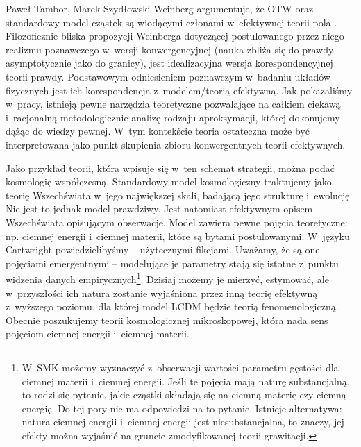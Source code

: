 \begin{artplenv2auth}{Paweł Tambor, Marek Szydłowski}
Weinberg argumentuje, że OTW oraz standardowy model cząstek są wiodącymi członami w~efektywnej teorii pola
\parencite[][]{weinberg_effective_2016}. %
 Filozoficznie bliska propozycji Weinberga dotyczącej postulowanego przez niego realizmu poznawczego w~wersji konwergencyjnej (nauka zbliża się do prawdy asymptotycznie jako do granicy), jest idealizacyjna wersja korespondencyjnej teorii prawdy. Podstawowym odniesieniem poznawczym w~badaniu układów fizycznych jest ich korespondencja z~modelem/teorią efektywną. Jak pokazaliśmy w~pracy, istnieją pewne narzędzia teoretyczne pozwalające na całkiem ciekawą i~racjonalną metodologicznie analizę rodzaju aproksymacji, której dokonujemy dążąc do wiedzy pewnej. W~tym kontekście teoria ostateczna może być interpretowana jako punkt skupienia zbioru konwergentnych teorii efektywnych.

Jako przykład teorii, która wpisuje się w~ten schemat strategii, można podać kosmologię współczesną. Standardowy model kosmologiczny traktujemy jako teorię Wszechświata w~jego największej skali, badającą jego strukturę i~ewolucję. Nie jest to jednak model prawdziwy. Jest natomiast efektywnym opisem Wszechświata opisującym obserwacje. Model zawiera pewne pojęcia teoretyczne: np. ciemnej energii i~ciemnej materii, które są bytami postulowanymi. W~języku Cartwright powiedzielibyśmy -- użytecznymi fikcjami. Uważamy, że są one pojęciami emergentnymi -- modelujące je parametry stają się istotne z~punktu widzenia danych empirycznych\footnote{W~SMK możemy wyznaczyć z~obserwacji wartości parametru gęstości dla ciemnej materii i~ciemnej energii. Jeśli te pojęcia mają naturę substancjalną, to rodzi się pytanie, jakie cząstki składają się na ciemną materię czy ciemną energię. Do tej pory nie ma odpowiedzi na to pytanie. Istnieje alternatywa: natura ciemnej energii i~ciemnej energii jest niesubstancjalna, to znaczy, jej efekty można wyjaśnić na gruncie zmodyfikowanej teorii grawitacji.}. Dzisiaj możemy je mierzyć, estymować, ale w~przyszłości ich natura zostanie wyjaśniona przez inną teorię efektywną z~wyższego poziomu, dla której model LCDM będzie teorią fenomenologiczną. Obecnie poszukujemy teorii kosmologicznej mikroskopowej, która nada sens pojęciom ciemnej energii i~ciemnej materii.


\end{artplenv2auth}
